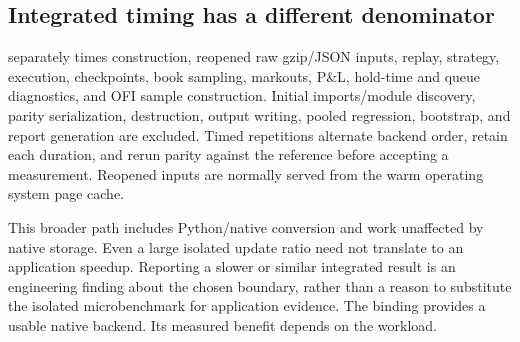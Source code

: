 \subsection{Integrated timing has a different denominator}

 separately times construction,
reopened raw gzip/JSON inputs, replay, strategy, execution, checkpoints, book
sampling, markouts, P\&L, hold-time and queue diagnostics, and OFI sample
construction. Initial imports/module discovery, parity serialization,
destruction, output writing, pooled regression, bootstrap, and report
generation are excluded. Timed repetitions alternate backend order, retain
each duration, and rerun parity against the reference before accepting a
measurement. Reopened inputs are normally served from the warm operating
system page cache.

This broader path includes Python/native conversion and work unaffected by
native storage. Even a large isolated update ratio need not translate to an
application speedup. Reporting a slower or similar integrated result is an
engineering finding about the chosen boundary, rather than a reason to
substitute the isolated microbenchmark for application evidence. The binding
provides a usable native backend. Its measured benefit depends on the workload.
